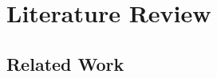 \chapter{Literature Review}
\label{ch:Literature Review}

\section{Related Work}
\label{ch:Literature Review:sec:Related Work}
